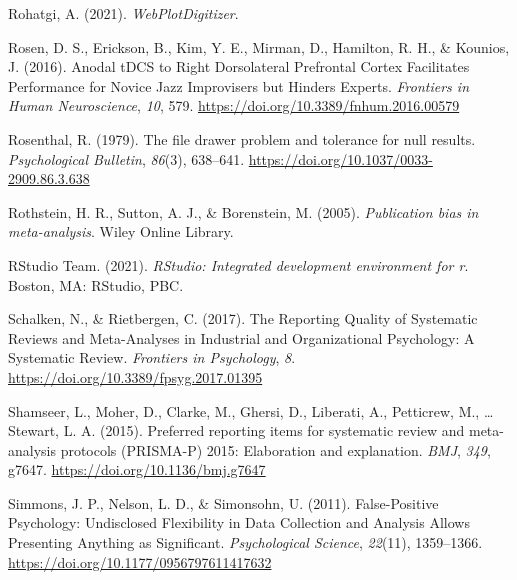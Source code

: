 \documentclass[
  man,floatsintext]{apa6}
\newlength{\cslhangindent}
\newlength{\cslentryspacingunit} %
\newenvironment{CSLReferences}[2] %
 {%
  \setlength{\parindent}{0pt}
  \ifodd #1
  \let\oldpar\par
  \def\par{\hangindent=\cslhangindent\oldpar}
  \fi
  \setlength{\parskip}{#2\cslentryspacingunit}
 }%
 {}
\begin{document}
\begin{CSLReferences}{1}{0}
\leavevmode{}%
Rohatgi, A. (2021). \emph{{WebPlotDigitizer}}.

\leavevmode{}%
Rosen, D. S., Erickson, B., Kim, Y. E., Mirman, D., Hamilton, R. H., \& Kounios, J. (2016). Anodal {tDCS} to {Right Dorsolateral Prefrontal Cortex Facilitates Performance} for {Novice Jazz Improvisers} but {Hinders Experts}. \emph{Frontiers in Human Neuroscience}, \emph{10}, 579. \url{https://doi.org/10.3389/fnhum.2016.00579}

\leavevmode{}%
Rosenthal, R. (1979). The file drawer problem and tolerance for null results. \emph{Psychological Bulletin}, \emph{86}(3), 638--641. \url{https://doi.org/10.1037/0033-2909.86.3.638}

\leavevmode{}%
Rothstein, H. R., Sutton, A. J., \& Borenstein, M. (2005). \emph{Publication bias in meta-analysis}. {Wiley Online Library}.

\leavevmode{}%
RStudio Team. (2021). \emph{{RStudio}: {Integrated} development environment for r}. {Boston, MA}: {RStudio, PBC}.

\leavevmode{}%
Schalken, N., \& Rietbergen, C. (2017). The {Reporting Quality} of {Systematic Reviews} and {Meta-Analyses} in {Industrial} and {Organizational Psychology}: {A Systematic Review}. \emph{Frontiers in Psychology}, \emph{8}. \url{https://doi.org/10.3389/fpsyg.2017.01395}

\leavevmode{}%
Shamseer, L., Moher, D., Clarke, M., Ghersi, D., Liberati, A., Petticrew, M., \ldots{} Stewart, L. A. (2015). Preferred reporting items for systematic review and meta-analysis protocols ({PRISMA-P}) 2015: Elaboration and explanation. \emph{BMJ}, \emph{349}, g7647. \url{https://doi.org/10.1136/bmj.g7647}

\leavevmode{}%
Simmons, J. P., Nelson, L. D., \& Simonsohn, U. (2011). False-{Positive Psychology}: {Undisclosed Flexibility} in {Data Collection} and {Analysis Allows Presenting Anything} as {Significant}. \emph{Psychological Science}, \emph{22}(11), 1359--1366. \url{https://doi.org/10.1177/0956797611417632}


\end{CSLReferences}
\end{document}
